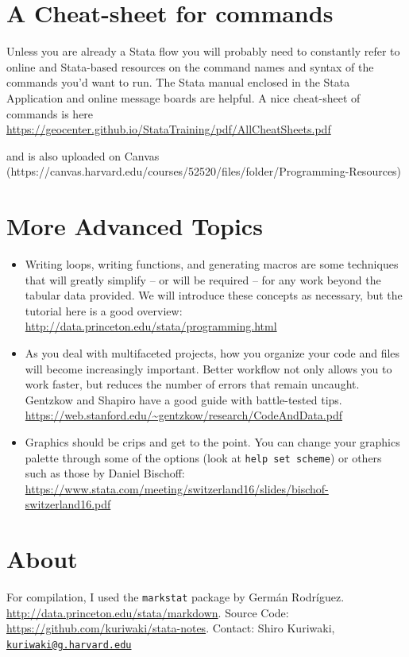 \documentclass[]{article}
\providecommand{\tightlist}{%
  \setlength{\itemsep}{0pt}\setlength{\parskip}{0pt}}
\begin{document}
\section{A Cheat-sheet for commands}\label{a-cheat-sheet-for-commands}

Unless you are already a Stata flow you will probably need to constantly
refer to online and Stata-based resources on the command names and
syntax of the commands you'd want to run. The Stata manual enclosed in
the Stata Application and online message boards are helpful. A nice
cheat-sheet of commands is here
\url{https://geocenter.github.io/StataTraining/pdf/AllCheatSheets.pdf}

and is also uploaded on Canvas
(https://canvas.harvard.edu/courses/52520/files/folder/Programming-Resources)

\section{More Advanced Topics}\label{more-advanced-topics}

\begin{itemize}
\tightlist
\item
  Writing loops, writing functions, and generating macros are some
  techniques that will greatly simplify -- or will be required -- for
  any work beyond the tabular data provided. We will introduce these
  concepts as necessary, but the tutorial here is a good overview:
  \url{http://data.princeton.edu/stata/programming.html}
\item
  As you deal with multifaceted projects, how you organize your code and
  files will become increasingly important. Better workflow not only
  allows you to work faster, but reduces the number of errors that
  remain uncaught. Gentzkow and Shapiro have a good guide with
  battle-tested tips.
  \url{https://web.stanford.edu/~gentzkow/research/CodeAndData.pdf}
\item
  Graphics should be crips and get to the point. You can change your
  graphics palette through some of the options (look at
  \texttt{help\ set\ scheme}) or others such as those by Daniel
  Bischoff:
  \url{https://www.stata.com/meeting/switzerland16/slides/bischof-switzerland16.pdf}
\end{itemize}

\section{About}\label{about}

For compilation, I used the \texttt{markstat} package by Germán
Rodríguez. \url{http://data.princeton.edu/stata/markdown}. Source Code:
\url{https://github.com/kuriwaki/stata-notes}. Contact: Shiro Kuriwaki,
\href{mailto:kuriwaki@g.harvard.edu}{\nolinkurl{kuriwaki@g.harvard.edu}}
\end{document}

